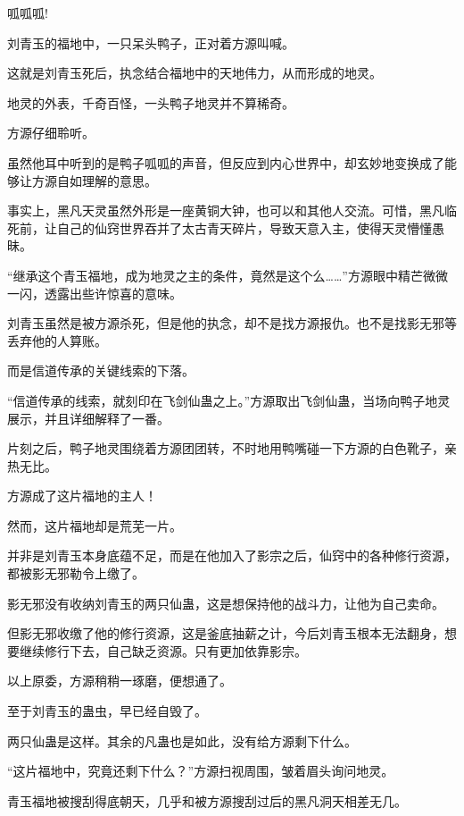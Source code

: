 
\begin{this_body}



呱呱呱!

刘青玉的福地中，一只呆头鸭子，正对着方源叫喊。

这就是刘青玉死后，执念结合福地中的天地伟力，从而形成的地灵。

地灵的外表，千奇百怪，一头鸭子地灵并不算稀奇。

方源仔细聆听。

虽然他耳中听到的是鸭子呱呱的声音，但反应到内心世界中，却玄妙地变换成了能够让方源自如理解的意思。

事实上，黑凡天灵虽然外形是一座黄铜大钟，也可以和其他人交流。可惜，黑凡临死前，让自己的仙窍世界吞并了太古青天碎片，导致天意入主，使得天灵懵懂愚昧。

“继承这个青玉福地，成为地灵之主的条件，竟然是这个么……”方源眼中精芒微微一闪，透露出些许惊喜的意味。

刘青玉虽然是被方源杀死，但是他的执念，却不是找方源报仇。也不是找影无邪等丢弃他的人算账。

而是信道传承的关键线索的下落。

“信道传承的线索，就刻印在飞剑仙蛊之上。”方源取出飞剑仙蛊，当场向鸭子地灵展示，并且详细解释了一番。

片刻之后，鸭子地灵围绕着方源团团转，不时地用鸭嘴碰一下方源的白色靴子，亲热无比。

方源成了这片福地的主人！

然而，这片福地却是荒芜一片。

并非是刘青玉本身底蕴不足，而是在他加入了影宗之后，仙窍中的各种修行资源，都被影无邪勒令上缴了。

影无邪没有收纳刘青玉的两只仙蛊，这是想保持他的战斗力，让他为自己卖命。

但影无邪收缴了他的修行资源，这是釜底抽薪之计，今后刘青玉根本无法翻身，想要继续修行下去，自己缺乏资源。只有更加依靠影宗。

以上原委，方源稍稍一琢磨，便想通了。

至于刘青玉的蛊虫，早已经自毁了。

两只仙蛊是这样。其余的凡蛊也是如此，没有给方源剩下什么。

“这片福地中，究竟还剩下什么？”方源扫视周围，皱着眉头询问地灵。

青玉福地被搜刮得底朝天，几乎和被方源搜刮过后的黑凡洞天相差无几。


\end{this_body}
